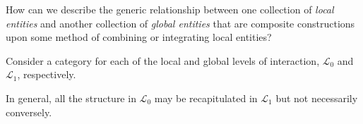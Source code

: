 \begin{frame}
\begin{block}{}
How can we describe the generic relationship between one collection of {\it local entities} and another collection of {\it global entities} that are composite constructions upon some method of combining or integrating local entities?
\end{block}
\begin{block}{}
Consider a category for each of the local and global levels of interaction, $\mathcal{L}_0$ and $\mathcal{L}_1$, respectively. 
\end{block}
\begin{block}{}
In general, all the structure in $\mathcal{L}_0$ may be recapitulated in $\mathcal{L}_1$ but not necessarily conversely.
\end{block}
\end{frame}